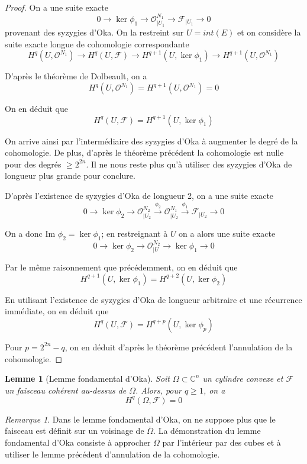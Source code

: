 \documentclass{article}
\newtheorem{lemme}[theoreme]{Lemme}
\theoremstyle{definition}
\theoremstyle{remark}
\newtheorem{remarque}{Remarque}
\begin{document}
\begin{proof}
On a une suite exacte
$$0 \to \ker \phi_1 \to \mathcal{O}^{N_1}_{|U_1} \to \mathcal{F}_{|U_1} \to 0$$
provenant des syzygies d'Oka. On la restreint sur $U=int(E)$ et on considère la suite exacte longue de cohomologie correspondante
$$H^q(U, \mathcal{O}^{N_1}) \to H^q(U, \mathcal{F}) \to  H^{q+1}(U, \ker \phi_1) \to H^{q+1}(U, \mathcal{O}^{N_1})$$

D'après le théorème de Dolbeault, on a
$$H^q(U, \mathcal{O}^{N_1}) =  H^{q+1}(U, \mathcal{O}^{N_1}) = 0$$

On en déduit que $$H^q(U, \mathcal{F}) =  H^{q+1}(U, \ker \phi_1)$$

On arrive ainsi par l'intermédiaire des syzygies d'Oka à augmenter le degré de la cohomologie. De plus, d'après le théorème précédent la cohomologie est nulle pour des degrés $\geq 2^{2n}$. Il ne nous reste plus qu'à utiliser des syzygies d'Oka de longueur plus grande pour conclure.

D'après l'existence de syzygies d'Oka de longueur 2, on a une suite exacte
$$0 \to \ker \phi_2 \to \mathcal{O}^{N_2}_{|U_2} \overset{\phi_2}{\to} \mathcal{O}^{N_1}_{|U_2} \overset{\phi_1}{\to} \mathcal{F}_{|U_2} \to 0$$

On a donc Im $\phi_2 = \ker \phi_1$; en restreignant à $U$ on a alors une suite exacte
$$0 \to \ker \phi_2 \to \mathcal{O}^{N_2}_{|U} \to \ker \phi_1 \to 0$$

Par le même raisonnement que précédemment, on en déduit que
$$H^{q+1}(U, \ker \phi_1) =  H^{q+2}(U, \ker \phi_2)$$

En utilisant l'existence de syzygies d'Oka de longueur arbitraire et une récurrence immédiate, on en déduit que
$$H^q(U, \mathcal{F}) =  H^{q+p}(U, \ker \phi_p)$$

Pour $p = 2^{2n}-q$, on en déduit d'après le théorème précédent l'annulation de la cohomologie.
\end{proof}

\begin{lemme}[Lemme fondamental d'Oka]
Soit $\Omega \subset \mathbb{C}^n$ un cylindre convexe et $\mathcal{F}$ un faisceau cohérent au-dessus de $\Omega$. Alors, pour $q \geq 1$, on a
$$H^q(\Omega, \mathcal{F})=0$$
\end{lemme}

\begin{remarque}
Dans le lemme fondamental d'Oka, on ne suppose plus que le faisceau est définit sur un voisinage de $\bar{\Omega}$. La démonstration du lemme fondamental d'Oka consiste à approcher $\Omega$ par l'intérieur par des cubes et à utiliser le lemme précédent d'annulation de la cohomologie.
\end{remarque}
\end{document}
